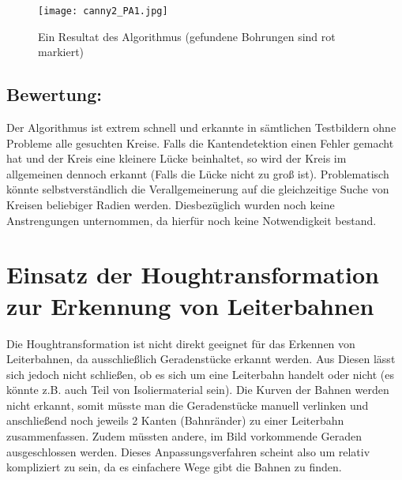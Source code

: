\begin{figure}[H]
  \begin{center}
    \texttt{[image: canny2\_PA1.jpg]}
    \caption{Ein Resultat des Algorithmus (gefundene Bohrungen sind rot markiert)}
    \label{fig:b_alg_1}
  \end{center}
\end{figure}


\subsection{Bewertung:}
Der Algorithmus ist extrem schnell und erkannte in sämtlichen Testbildern ohne Probleme alle gesuchten Kreise. Falls die Kantendetektion einen Fehler gemacht hat und der Kreis eine kleinere Lücke beinhaltet, so wird der Kreis im allgemeinen dennoch erkannt (Falls die Lücke nicht zu groß ist). \newline
Problematisch könnte selbstverständlich die Verallgemeinerung auf die gleichzeitige Suche von Kreisen beliebiger Radien werden. Diesbezüglich wurden noch keine Anstrengungen unternommen, da hierfür noch keine Notwendigkeit bestand.

\section{Einsatz der Houghtransformation zur Erkennung von Leiterbahnen}
Die Houghtransformation ist nicht direkt geeignet für das Erkennen von Leiterbahnen, da ausschließlich Geradenstücke erkannt werden. Aus Diesen lässt sich jedoch nicht schließen, ob es sich um eine Leiterbahn handelt oder nicht (es könnte z.B. auch Teil von Isoliermaterial sein). \newline
Die Kurven der Bahnen werden nicht erkannt, somit müsste man die Geradenstücke manuell verlinken und anschließend noch jeweils 2 Kanten (Bahnränder) zu einer Leiterbahn zusammenfassen. Zudem müssten andere, im Bild vorkommende Geraden ausgeschlossen werden. \newline
Dieses Anpassungsverfahren scheint also um relativ kompliziert zu sein, da es einfachere Wege gibt die Bahnen zu finden.  

